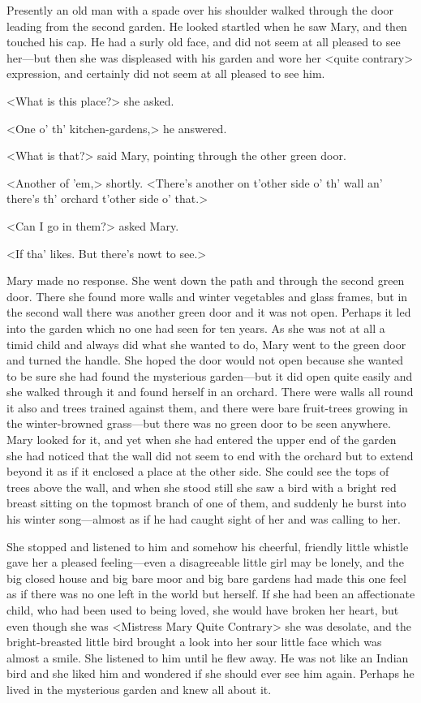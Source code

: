 Presently an old man with a spade over his shoulder walked through the door leading from the second garden. He looked startled when he saw Mary, and then touched his cap. He had a surly old face, and did not seem at all pleased to see her—but then she was displeased with his garden and wore her <quite contrary> expression, and certainly did not seem at all pleased to see him.

<What is this place?> she asked.

<One o' th' kitchen-gardens,> he answered.

<What is that?> said Mary, pointing through the other green door.

<Another of 'em,> shortly. <There's another on t'other side o' th' wall an' there's th' orchard t'other side o' that.>

<Can I go in them?> asked Mary.

<If tha' likes. But there's nowt to see.>

Mary made no response. She went down the path and through the second green door. There she found more walls and winter vegetables and glass frames, but in the second wall there was another green door and it was not open. Perhaps it led into the garden which no one had seen for ten years. As she was not at all a timid child and always did what she wanted to do, Mary went to the green door and turned the handle. She hoped the door would not open because she wanted to be sure she had found the mysterious garden—but it did open quite easily and she walked through it and found herself in an orchard. There were walls all round it also and trees trained against them, and there were bare fruit-trees growing in the winter-browned grass—but there was no green door to be seen anywhere. Mary looked for it, and yet when she had entered the upper end of the garden she had noticed that the wall did not seem to end with the orchard but to extend beyond it as if it enclosed a place at the other side. She could see the tops of trees above the wall, and when she stood still she saw a bird with a bright red breast sitting on the topmost branch of one of them, and suddenly he burst into his winter song—almost as if he had caught sight of her and was calling to her.

She stopped and listened to him and somehow his cheerful, friendly little whistle gave her a pleased feeling—even a disagreeable little girl may be lonely, and the big closed house and big bare moor and big bare gardens had made this one feel as if there was no one left in the world but herself. If she had been an affectionate child, who had been used to being loved, she would have broken her heart, but even though she was <Mistress Mary Quite Contrary> she was desolate, and the bright-breasted little bird brought a look into her sour little face which was almost a smile. She listened to him until he flew away. He was not like an Indian bird and she liked him and wondered if she should ever see him again. Perhaps he lived in the mysterious garden and knew all about it.

